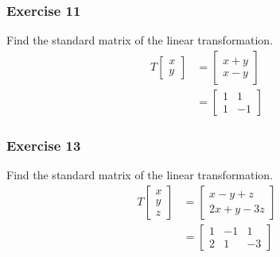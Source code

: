 \documentclass{math}
\begin{document}
\subsubsection*{Exercise 11}
Find the standard matrix of the linear transformation.
\begin{align*}
  T\begin{bmatrix}x \\ y\end{bmatrix} &=
    \begin{bmatrix}x+y \\ x-y\end{bmatrix} \\
  &= \begin{bmatrix}
    1 & 1 \\
    1 & -1
  \end{bmatrix}
\end{align*}

\subsubsection*{Exercise 13}
Find the standard matrix of the linear transformation.
\begin{align*}
  T\begin{bmatrix}x \\ y \\ z\end{bmatrix} &= \begin{bmatrix}
    x-y+z \\
    2x+y-3z
  \end{bmatrix} \\
  &= \begin{bmatrix}
    1 & -1 & 1 \\
    2 & 1 & -3
  \end{bmatrix}
\end{align*}
\end{document}
